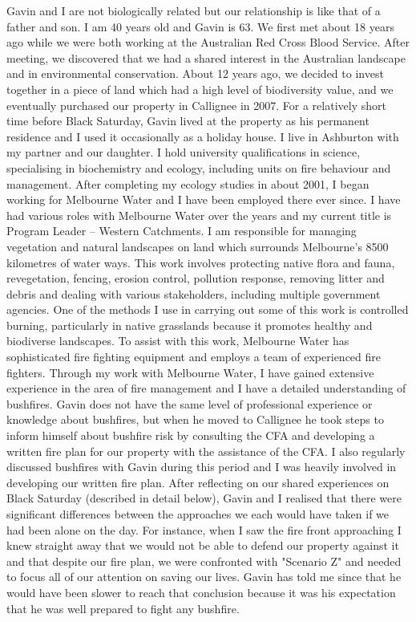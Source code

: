 \documentclass[a4paper]{article}
\begin{document}
        Gavin and I are not biologically related but our relationship is like that of a father and son. I am 40 years old and Gavin is 63. We first met about 18 years ago while we were both working at the Australian Red Cross Blood Service. After meeting, we discovered that we had a shared interest in the Australian landscape and in environmental conservation. About 12 years ago, we decided to invest together in a piece of land which had a high level of biodiversity value, and we eventually purchased our property in Callignee in 2007. For a relatively short time before Black Saturday, Gavin lived at the property as his permanent residence and I used it occasionally as a holiday house. I live in Ashburton with my partner and our daughter.
        I hold university qualifications in science, specialising in biochemistry and ecology, including units on fire behaviour and management. After completing my ecology studies in about 2001, I began working for Melbourne Water and I have been employed there ever since. I have had various roles with Melbourne Water over the years and my current title is Program Leader – Western Catchments. I am responsible for managing vegetation and natural landscapes on land which surrounds Melbourne's 8500 kilometres of water ways. This work involves protecting native flora and fauna, revegetation, fencing, erosion control, pollution response, removing litter and debris and dealing with various stakeholders, including multiple government agencies. One of the methods I use in carrying out some of this work is controlled burning, particularly in native grasslands because it promotes healthy and biodiverse landscapes. To assist with this work, Melbourne Water has sophisticated fire fighting equipment and employs a team of experienced fire fighters.
        Through my work with Melbourne Water, I have gained extensive experience in the area of fire management and I have a detailed understanding of bushfires. Gavin does not have the same level of professional experience or knowledge about bushfires, but when he moved to Callignee he took steps to inform himself about bushfire risk by consulting the CFA and developing a written fire plan for our property with the assistance of the CFA. I also regularly discussed bushfires with Gavin during this period and I was heavily involved in developing our written fire plan.
        After reflecting on our shared experiences on Black Saturday (described in detail below), Gavin and I realised that there were significant differences between the approaches we each would have taken if we had been alone on the day. For instance, when I saw the fire front approaching I knew straight away that we would not be able to defend our property against it and that despite our fire plan, we were confronted with "Scenario Z" and needed to focus all of our attention on saving our lives. Gavin has told me since that he would have been slower to reach that conclusion because it was his expectation that he was well prepared to fight any bushfire.
\end{document}

